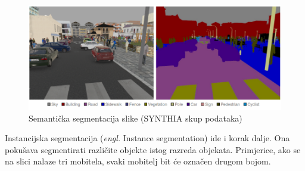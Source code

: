 \begin{enumerate}
\begin{figure}[htb]
\centering
\includegraphics[width=\linewidth]{img/SemanticSegmentation.png}
\caption{Semantička segmentacija slike (SYNTHIA skup podataka)}
\label{img:semanticSegmentation}
\end{figure}

Instancijska segmentacija (\textit{engl.} Instance segmentation) ide i korak dalje. Ona pokušava segmentirati različite objekte istog razreda objekata. Primjerice, ako se na slici nalaze tri mobitela, svaki mobitelj bit će označen drugom bojom.


\end{enumerate}

